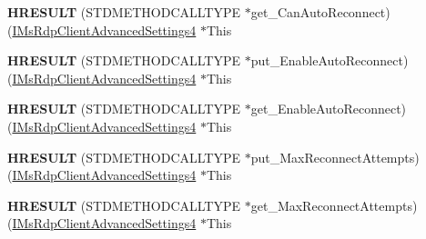 \begin{DoxyCompactItemize}
{\bfseries H\+R\+E\+S\+U\+LT} (S\+T\+D\+M\+E\+T\+H\+O\+D\+C\+A\+L\+L\+T\+Y\+PE $\ast$get\+\_\+\+Can\+Auto\+Reconnect)(\hyperlink{interface_m_s_t_s_c_lib_1_1_i_ms_rdp_client_advanced_settings4}{I\+Ms\+Rdp\+Client\+Advanced\+Settings4} $\ast$This
\item 
\mbox{\label{struct_m_s_t_s_c_lib_1_1_i_ms_rdp_client_advanced_settings4_vtbl_a203917b87ede8b574a18d74f6f72161c}} 
{\bfseries H\+R\+E\+S\+U\+LT} (S\+T\+D\+M\+E\+T\+H\+O\+D\+C\+A\+L\+L\+T\+Y\+PE $\ast$put\+\_\+\+Enable\+Auto\+Reconnect)(\hyperlink{interface_m_s_t_s_c_lib_1_1_i_ms_rdp_client_advanced_settings4}{I\+Ms\+Rdp\+Client\+Advanced\+Settings4} $\ast$This
\item 
\mbox{\label{struct_m_s_t_s_c_lib_1_1_i_ms_rdp_client_advanced_settings4_vtbl_aa580b457b0bda71d24e1cb575686f008}} 
{\bfseries H\+R\+E\+S\+U\+LT} (S\+T\+D\+M\+E\+T\+H\+O\+D\+C\+A\+L\+L\+T\+Y\+PE $\ast$get\+\_\+\+Enable\+Auto\+Reconnect)(\hyperlink{interface_m_s_t_s_c_lib_1_1_i_ms_rdp_client_advanced_settings4}{I\+Ms\+Rdp\+Client\+Advanced\+Settings4} $\ast$This
\item 
\mbox{\label{struct_m_s_t_s_c_lib_1_1_i_ms_rdp_client_advanced_settings4_vtbl_a69aba756f2687c2be2d6c0015848df12}} 
{\bfseries H\+R\+E\+S\+U\+LT} (S\+T\+D\+M\+E\+T\+H\+O\+D\+C\+A\+L\+L\+T\+Y\+PE $\ast$put\+\_\+\+Max\+Reconnect\+Attempts)(\hyperlink{interface_m_s_t_s_c_lib_1_1_i_ms_rdp_client_advanced_settings4}{I\+Ms\+Rdp\+Client\+Advanced\+Settings4} $\ast$This
\item 
\mbox{\label{struct_m_s_t_s_c_lib_1_1_i_ms_rdp_client_advanced_settings4_vtbl_a0328c5e5d9f53448d6c9cd8f656d411e}} 
{\bfseries H\+R\+E\+S\+U\+LT} (S\+T\+D\+M\+E\+T\+H\+O\+D\+C\+A\+L\+L\+T\+Y\+PE $\ast$get\+\_\+\+Max\+Reconnect\+Attempts)(\hyperlink{interface_m_s_t_s_c_lib_1_1_i_ms_rdp_client_advanced_settings4}{I\+Ms\+Rdp\+Client\+Advanced\+Settings4} $\ast$This
\item 
\mbox{\label{struct_m_s_t_s_c_lib_1_1_i_ms_rdp_client_advanced_settings4_vtbl_a6951f27ebcb1eab5d4f97e764223dd51}} 

\end{DoxyCompactItemize}
